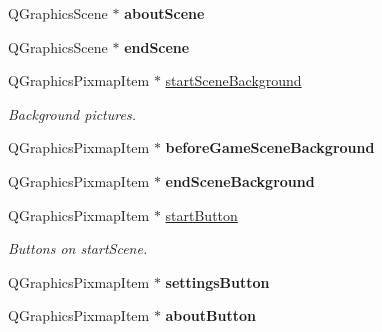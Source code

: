 \begin{DoxyCompactItemize}
\item 
Q\+Graphics\+Scene $\ast$ {\bfseries about\+Scene}\hypertarget{class_game_menu_a347306846ed65b9ed5ed3d457e46c5ac}{}\label{class_game_menu_a347306846ed65b9ed5ed3d457e46c5ac}

\item 
Q\+Graphics\+Scene $\ast$ {\bfseries end\+Scene}\hypertarget{class_game_menu_a235b359eff5bab01a8ca9d2b75466af1}{}\label{class_game_menu_a235b359eff5bab01a8ca9d2b75466af1}

\item 
Q\+Graphics\+Pixmap\+Item $\ast$ \hyperlink{class_game_menu_ab6fd3496d0426f663e9893a893764fcf}{start\+Scene\+Background}\hypertarget{class_game_menu_ab6fd3496d0426f663e9893a893764fcf}{}\label{class_game_menu_ab6fd3496d0426f663e9893a893764fcf}

\begin{DoxyCompactList}\small\item\em Background pictures. \end{DoxyCompactList}\item 
Q\+Graphics\+Pixmap\+Item $\ast$ {\bfseries before\+Game\+Scene\+Background}\hypertarget{class_game_menu_a59aa0e84b5d4db53a62bb52480856c25}{}\label{class_game_menu_a59aa0e84b5d4db53a62bb52480856c25}

\item 
Q\+Graphics\+Pixmap\+Item $\ast$ {\bfseries end\+Scene\+Background}\hypertarget{class_game_menu_a32c0e1b35559b840ffc5628cb59c8639}{}\label{class_game_menu_a32c0e1b35559b840ffc5628cb59c8639}

\item 
Q\+Graphics\+Pixmap\+Item $\ast$ \hyperlink{class_game_menu_a22c3e73fc24f9699e6a9f4bc1d6fbd52}{start\+Button}\hypertarget{class_game_menu_a22c3e73fc24f9699e6a9f4bc1d6fbd52}{}\label{class_game_menu_a22c3e73fc24f9699e6a9f4bc1d6fbd52}

\begin{DoxyCompactList}\small\item\em Buttons on start\+Scene. \end{DoxyCompactList}\item 
Q\+Graphics\+Pixmap\+Item $\ast$ {\bfseries settings\+Button}\hypertarget{class_game_menu_aca49d1e3a9dfec037cbc85a01cb6df82}{}\label{class_game_menu_aca49d1e3a9dfec037cbc85a01cb6df82}

\item 
Q\+Graphics\+Pixmap\+Item $\ast$ {\bfseries about\+Button}\hypertarget{class_game_menu_a3d6ca189f02e14ed5cfb5451526a271b}{}\label{class_game_menu_a3d6ca189f02e14ed5cfb5451526a271b}


\end{DoxyCompactItemize}
